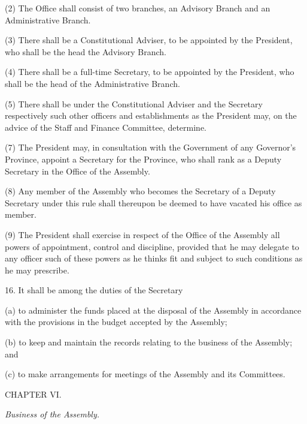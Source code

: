 (2) The Office shall consist of two branches, an Advisory Branch and an Administrative Branch.



(3) There shall be a Constitutional Adviser, to be appointed by the President, who shall be the head the Advisory Branch.



(4) There shall be a full-time Secretary, to be appointed by the President, who shall be the head of the Administrative Branch.



(5) There shall be under the Constitutional Adviser and the Secretary respectively such other officers and establishments as the President may, on the advice of the Staff and Finance Committee, determine.



(7) The President may, in consultation with the Government of any Governor\textquoteright{}s Province, appoint a Secretary for the Province, who shall rank as a Deputy Secretary in the Office of the Assembly.



(8) Any member of the Assembly who becomes the Secretary of a Deputy Secretary under this rule shall thereupon be deemed to have vacated his office as member.



(9) The President shall exercise in respect of the Office of the Assembly all powers of appointment, control and discipline, provided that he may delegate to any officer such of these powers as he thinks fit and subject to such conditions as he may prescribe.



16. It shall be among the duties of the Secretary\textemdash{}



(a) to administer the funds placed at the disposal of the Assembly in accordance with the provisions in the budget accepted by the Assembly;

(b) to keep and maintain the records relating to the business of the Assembly; and

(c) to make arrangements for meetings of the Assembly and its Committees.



\begin{center}
CHAPTER VI.\end{center}
\begin{center}
\emph{Business of the Assembly.}\end{center}


